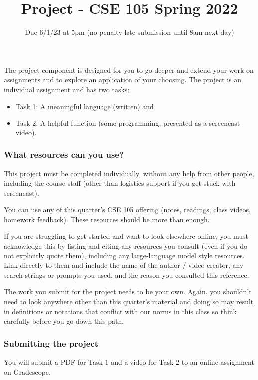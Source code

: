 \title{Project - CSE 105 Spring 2022}
\date{Due 6/1/23 at 5pm (no penalty late submission until 8am next day)}


\maketitle

\thispagestyle{fancy}

The project component is designed for you to go deeper and extend your work on assignments 
and to explore an application of your choosing. 
The project is an individual assignment and has 
two tasks: 
\begin{itemize}
    \item Task 1: A meaningful language (written) and \item Task 2: A helpful function (some programming, presented as a screencast video).
\end{itemize}
\vspace{-20pt}


\subsubsection*{What resources can you use?}
This project must be completed individually, without any help from other people, 
including the course staff (other than logistics support if you get stuck with screencast). 

You can use any of this quarter's CSE 105 offering (notes, readings, class videos, homework feedback). 
These resources should be more than enough. 

If you are struggling to get started and want to 
look elsewhere online, you must acknowledge this by listing and 
citing any resources you consult 
(even if you do not explicitly quote them), including any large-language model style resources. 
Link directly to them and include the name of the 
author / video creator, any search strings or prompts you used, and the reason you consulted this reference. 

The work you submit for 
the project needs to be your own. Again, you shouldn't need to look anywhere other 
than this quarter's material and doing so may result in definitions or notations 
that conflict with our norms in this class so think carefully before you go down this path.

\subsubsection*{Submitting the project}
You will submit a PDF for Task 1 and a video for Task 2 
to an online assignment on Gradescope.


